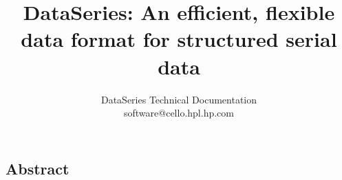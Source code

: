 \documentclass[twocolumn, 10pt]{article}
\begin{document}
\newcommand{\DataSeries}{DataSeries}
\newcommand{\DS}{DS}

\title{\Large \bf \DataSeries{}: An efficient, flexible data format for structured serial data}

\author{
\begin{tabular}{c}
DataSeries Technical Documentation \\
software@cello.hpl.hp.com \\
\end{tabular}
}



\maketitle


\subsection*{Abstract}






% 

%

%

\end{document}
